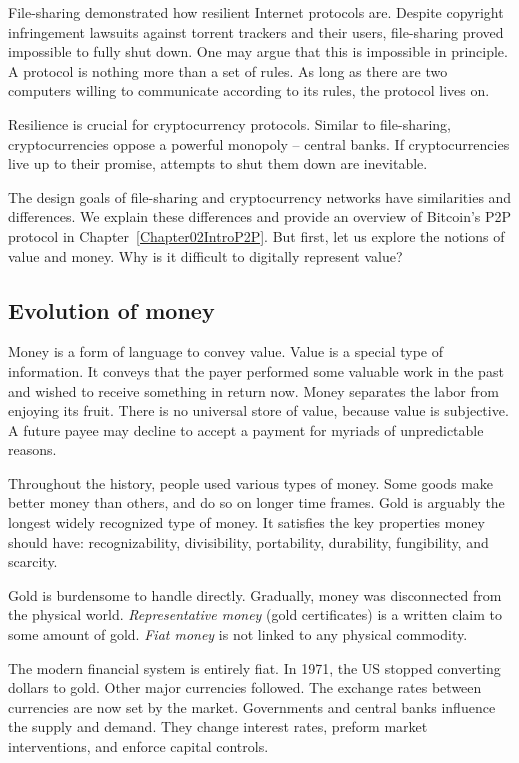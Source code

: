 File-sharing demonstrated how resilient Internet protocols are.
Despite copyright infringement lawsuits against torrent trackers and their users, file-sharing proved impossible to fully shut down.
One may argue that this is impossible in principle.
A protocol is nothing more than a set of rules.
As long as there are two computers willing to communicate according to its rules, the protocol lives on.

Resilience is crucial for cryptocurrency protocols.
Similar to file-sharing, cryptocurrencies oppose a powerful monopoly -- central banks.
If cryptocurrencies live up to their promise, attempts to shut them down are inevitable.

The design goals of file-sharing and cryptocurrency networks have similarities and differences.
We explain these differences and provide an overview of Bitcoin's P2P protocol in Chapter~\ref{Chapter02IntroP2P}.
But first, let us explore the notions of value and money.
Why is it difficult to digitally represent value?



\subsection{Evolution of money}

Money is a form of language to convey value.
Value is a special type of information.
It conveys that the payer performed some valuable work in the past and wished to receive something in return now.
Money separates the labor from enjoying its fruit.
There is no universal store of value, because value is subjective.
A future payee may decline to accept a payment for myriads of unpredictable reasons.

Throughout the history, people used various types of money.
Some goods make better money than others, and do so on longer time frames.
Gold is arguably the longest widely recognized type of money.
It satisfies the key properties money should have: recognizability, divisibility, portability, durability, fungibility, and scarcity.

Gold is burdensome to handle directly.
Gradually, money was disconnected from the physical world.
\textit{Representative money} (gold certificates) is a written claim to some amount of gold.
\textit{Fiat money} is not linked to any physical commodity.

The modern financial system is entirely fiat.
In 1971, the US stopped converting dollars to gold.
Other major currencies followed.
The exchange rates between currencies are now set by the market.
Governments and central banks influence the supply and demand.
They change interest rates, preform market interventions, and enforce capital controls.


